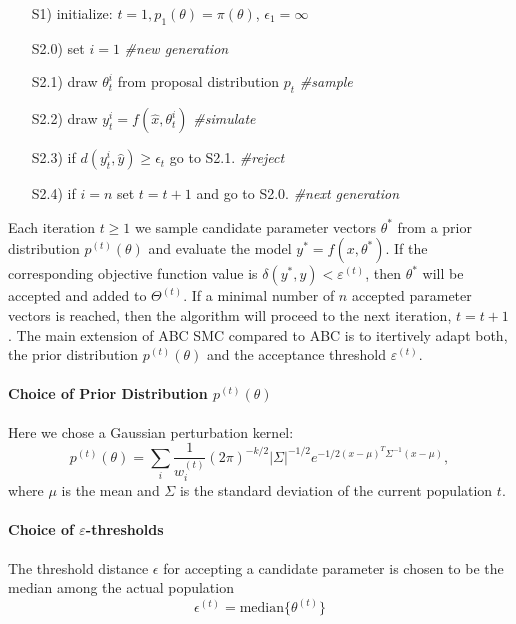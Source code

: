 \documentclass[10pt,letterpaper]{article}
\begin{document}
\begin{itemize}
\item[S1)] initialize: $t=1, p_{1}(\theta) = \pi(\theta)$, $\epsilon_{1} = \infty$
\item[S2.0)] set $i = 1$ \emph{\#new generation }
\item[S2.1)] draw $\theta_{t}^{i}$ from proposal distribution $p_{t}$ \emph{\#sample}
\item[S2.2)] draw $y_{t}^{i} = f(\hat{x}, \theta_{t}^{i})$ \emph{\#simulate}
\item[S2.3)] if $d( y_{t}^{i}, \hat{y}) \ge \epsilon_t$ go to S2.1. \emph{\#reject}
\item[S2.4)] if $i = n$ set $t=t+1$ and go to S2.0.  \emph{\#next generation}
\end{itemize}

Each iteration $t \ge 1$ we sample candidate parameter vectors $\theta^*$ from a prior distribution $p^{(t)}(\theta)$ and evaluate the model $y^{*} = f(x, \theta^*)$. If the corresponding  objective function value is $\delta(y^{*}, y) < \varepsilon^{(t)}$, then $\theta^*$ will be accepted and added to $\Theta^{(t)}$. If a minimal number of $n$ accepted parameter vectors is reached, then the algorithm will proceed to the next iteration, $t = t+1$. The main extension of ABC SMC compared to ABC is to itertively adapt both, the prior distribution $p^{(t)}(\theta)$ and the acceptance threshold $\varepsilon^{(t)}$.

{\color{red}
\paragraph{Choice of Prior Distribution $p^{(t)}(\theta)$}
Here we chose a Gaussian perturbation kernel:
\begin{equation}
	p^{(t)}(\theta) = \sum_{i}\frac{1}{w^{(t)}_{i}} (2\pi)^{-k/2} |\Sigma|^{-1/2}e^{-1/2(x-\mu)^{T}\Sigma^{-1}(x-\mu)},
\end{equation}
where $\mu$ is the mean and $\Sigma$ is the standard deviation of the current population $t$.
\paragraph{Choice of $\varepsilon$-thresholds} The threshold distance $\epsilon$ for accepting a candidate parameter is chosen to be the median among the actual population 
\begin{equation}
	\epsilon^{(t)} = \text{median} \{ \theta^{(t)} \}
\end{equation}
}
\end{document}
